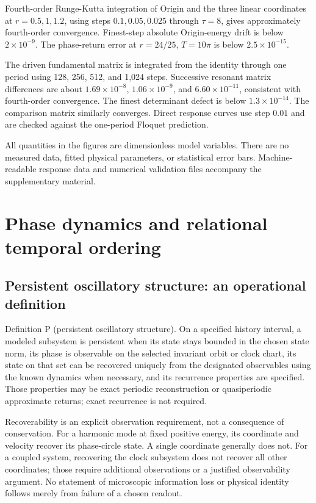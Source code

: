 \documentclass[aip,adv,preprint,floatfix]{revtex4-2}
\begin{document}
Fourth-order Runge-Kutta integration of Origin and the three linear coordinates at $r=0.5,1,1.2$, using steps $0.1,0.05,0.025$ through $\tau=8$, gives approximately fourth-order convergence. Finest-step absolute Origin-energy drift is below $2\times10^{-9}$. The phase-return error at $r=24/25$, $T=10\pi$ is below $2.5\times10^{-15}$.

The driven fundamental matrix is integrated from the identity through one period using 128, 256, 512, and 1,024 steps. Successive resonant matrix differences are about $1.69\times10^{-8}$, $1.06\times10^{-9}$, and $6.60\times10^{-11}$, consistent with fourth-order convergence. The finest determinant defect is below $1.3\times10^{-14}$. The comparison matrix similarly converges. Direct response curves use step $0.01$ and are checked against the one-period Floquet prediction.

All quantities in the figures are dimensionless model variables. There are no measured data, fitted physical parameters, or statistical error bars. Machine-readable response data and numerical validation files accompany the supplementary material.

\section{Phase dynamics and relational temporal ordering}
\subsection*{Persistent oscillatory structure: an operational definition}
Definition P (persistent oscillatory structure). On a specified history interval, a modeled subsystem is persistent when its state stays bounded in the chosen state norm, its phase is observable on the selected invariant orbit or clock chart, its state on that set can be recovered uniquely from the designated observables using the known dynamics when necessary, and its recurrence properties are specified. Those properties may be exact periodic reconstruction or quasiperiodic approximate returns; exact recurrence is not required.

Recoverability is an explicit observation requirement, not a consequence of conservation. For a harmonic mode at fixed positive energy, its coordinate and velocity recover its phase-circle state. A single coordinate generally does not. For a coupled system, recovering the clock subsystem does not recover all other coordinates; those require additional observations or a justified observability argument. No statement of microscopic information loss or physical identity follows merely from failure of a chosen readout.
\end{document}
